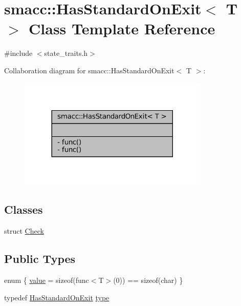 \hypertarget{classsmacc_1_1HasStandardOnExit}{}\section{smacc\+:\+:Has\+Standard\+On\+Exit$<$ T $>$ Class Template Reference}
\label{classsmacc_1_1HasStandardOnExit}


{\ttfamily \#include $<$state\+\_\+traits.\+h$>$}



Collaboration diagram for smacc\+:\+:Has\+Standard\+On\+Exit$<$ T $>$\+:
\nopagebreak
\begin{figure}[H]
\begin{center}
\leavevmode
\includegraphics[width=257pt]{classsmacc_1_1HasStandardOnExit__coll__graph}
\end{center}
\end{figure}
\subsection*{Classes}
\begin{DoxyCompactItemize}
\item 
struct \hyperlink{structsmacc_1_1HasStandardOnExit_1_1Check}{Check}
\end{DoxyCompactItemize}
\subsection*{Public Types}
\begin{DoxyCompactItemize}
\item 
enum \{ \hyperlink{classsmacc_1_1HasStandardOnExit_a97479f6c9a7d3b03a03acbd2629f3b3aa2105bb2411da08ef49f5b1fa5ce115c5}{value} = sizeof(func$<$T$>$(0)) == sizeof(char)
 \}
\item 
typedef \hyperlink{classsmacc_1_1HasStandardOnExit}{Has\+Standard\+On\+Exit} \hyperlink{classsmacc_1_1HasStandardOnExit_ab4466cdb73e2823f9395cc476f85068c}{type}
\end{DoxyCompactItemize}
